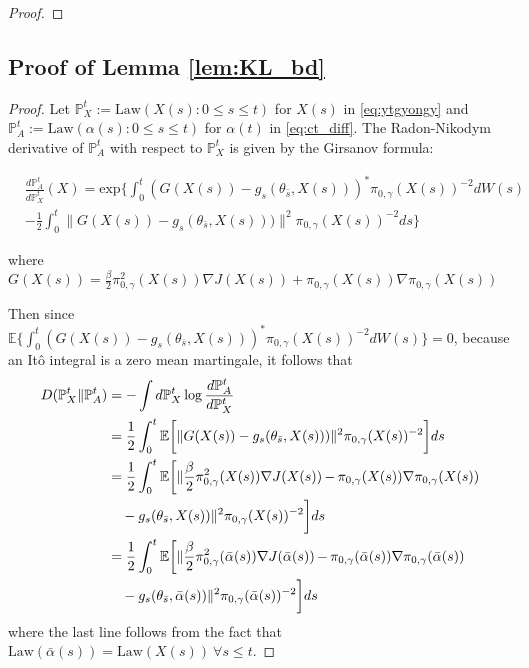 \documentclass[journal,onecolumn]{IEEEtran}
\newcommand{\grad}{\nabla}
\newcommand{\rew}{J}
\newcommand{\CE}{\mathbb{E}}
\newcommand{\alt}{\alpha(t)}
\newcommand{\browns}{W(s)}
\newcommand{\alsbar}{\bar{\alpha}(s)}
\newcommand{\sbar}{\bar{s}}
\newcommand{\lawXt}{\mathbb{P}_X^t}
\newcommand{\lawAt}{\mathbb{P}_A^t}
\newcommand{\KL}{D}
\newcommand{\law}{\textrm{Law}}
\newcommand{\ids}{\pi}
\newcommand{\idw}{\gamma}
\newcommand{\isp}{0,\idw}
\newcommand{\idistrw}{\ids_{\isp}}
\begin{document}
{\begin{proof}
\end{proof}


\subsection*{Proof of Lemma \ref{lem:KL_bd}}
\begin{proof}
Let $\lawXt := \law(X(s): 0 \leq s\leq t)$ for $X(s)$ in \ref{eq:ytgyongy} and $\lawAt := \law(\alpha(s) : 0 \leq s \leq t)$ for $\alt$ in \eqref{eq:ct_diff}.  The Radon-Nikodym derivative of $\lawAt$ with respect to $\lawXt$ is given by the Girsanov formula:

\begin{align*}
&\frac{d\lawAt}{d\lawXt}(X) = \textrm{exp}\{ \int_0^t \left(G(X(s)) - g_s(\theta_{\sbar},X(s)) \right)^{*}\idistrw(X(s))^{-2} d\browns \\
&-\frac{1}{2}\int_0^t\|G(X(s)) - g_s(\theta_{\sbar},X(s))) \|^2 \idistrw(X(s))^{-2} ds\} 
\end{align*}

where $G(X(s)) = \frac{\beta}{2}\idistrw^2(X(s))\grad\rew(X(s)) + \idistrw(X(s)) \grad \idistrw(X(s))$

Then since $\CE\{\int_0^t \left(G(X(s)) - g_s(\theta_{\sbar},X(s)) \right)^{*}\idistrw(X(s))^{-2} d\browns \} = 0$, because an It\^o integral is a zero mean martingale, it follows that
\begin{align*}
\KL(\lawXt \| \lawAt) &= -\int d\lawXt \log\frac{d\lawAt}{d\lawXt} \\
&= \frac{1}{2}\int_0^t \CE \biggl[ \|G(X(s)) - g_s(\theta_{\sbar},X(s))) \|^2 \idistrw(X(s))^{-2}\biggr] ds \\
&= \frac{1}{2} \int_0^t \CE \biggl[ \| \frac{\beta}{2}\idistrw^2(X(s))\grad \rew(X(s)) \,\color{black}{-}\, \idistrw(X(s)) \grad \idistrw(X(s))\\ & \quad -  g_s(\theta_{\sbar},X(s))\|^2
\idistrw(X(s))^{-2} \biggr] ds \\
&= \frac{1}{2} \int_0^t \CE \biggl[ \| \frac{\beta}{2}\idistrw^2(\alsbar)\grad \rew(\alsbar) \,\color{black}{-}\, \idistrw(\alsbar) \grad \idistrw(\alsbar)\\ & \quad -  g_s(\theta_{\sbar},\alsbar)\|^2
\idistrw(\alsbar)^{-2}\biggr] ds 
\end{align*}
where the last line follows from the fact that $\law(\alsbar) = \law(X(s)) \ \forall s \leq t$.


\end{proof}}
\end{document}
